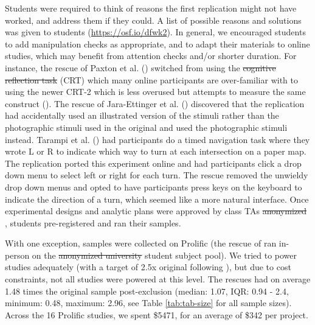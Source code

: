 \documentclass[
  english,
  a4paper,
]{article}
\providecommand{\DIFaddtex}[1]{{\protect\color{blue}\uwave{#1}}} %
\providecommand{\DIFdeltex}[1]{{\protect\color{red}\sout{#1}}}                      %
\providecommand{\DIFaddbegin}{} %
\providecommand{\DIFaddend}{} %
\providecommand{\DIFdelbegin}{} %
\providecommand{\DIFdelend}{} %
\providecommand{\DIFadd}[1]{\texorpdfstring{\DIFaddtex{#1}}{#1}} %
\providecommand{\DIFdel}[1]{\texorpdfstring{\DIFdeltex{#1}}{}} %
\newcommand{\DIFscaledelfig}{0.5}
\newlength{\DIFdelgraphicswidth} %
\newlength{\DIFdelgraphicsheight} %
\newcommand{\DIFaddincludegraphics}[2][]{{\color{blue}\fbox{\DIFOincludegraphics[#1]{#2}}}} %
\newcommand{\DIFdelincludegraphics}[2][]{%
\sbox{\DIFdelgraphicsbox}{\DIFOincludegraphics[#1]{#2}}%
\settoboxwidth{\DIFdelgraphicswidth}{\DIFdelgraphicsbox} %
\settoboxtotalheight{\DIFdelgraphicsheight}{\DIFdelgraphicsbox} %
\scalebox{\DIFscaledelfig}{%
\parbox[b]{\DIFdelgraphicswidth}{\usebox{\DIFdelgraphicsbox}\\[-\baselineskip] \rule{\DIFdelgraphicswidth}{0em}}\llap{\resizebox{\DIFdelgraphicswidth}{\DIFdelgraphicsheight}{%
\setlength{\unitlength}{\DIFdelgraphicswidth}%
\begin{picture}(1,1)%
\thicklines\linethickness{2pt} %
{\color[rgb]{1,0,0}\put(0,0){\framebox(1,1){}}}%
{\color[rgb]{1,0,0}\put(0,0){\line( 1,1){1}}}%
{\color[rgb]{1,0,0}\put(0,1){\line(1,-1){1}}}%
\end{picture}%
}\hspace*{3pt}}} %
} %
\DeclareRobustCommand{\DIFaddbegin}{\DIFOaddbegin \let\includegraphics\DIFaddincludegraphics} %
\DeclareRobustCommand{\DIFaddend}{\DIFOaddend \let\includegraphics\DIFOincludegraphics} %
\DeclareRobustCommand{\DIFdelbegin}{\DIFOdelbegin \let\includegraphics\DIFdelincludegraphics} %
\DeclareRobustCommand{\DIFdelend}{\DIFOaddend \let\includegraphics\DIFOincludegraphics} %
\begin{document}
Students were required to think of reasons the first replication might not have worked, and address them if they could.
A list of possible reasons and solutions was given to students (\url{https://osf.io/dfwk2}).
In general, we encouraged students to add manipulation checks as appropriate, and to adapt their materials to online studies, which may benefit from attention checks and/or shorter duration.
For instance, the rescue of Paxton et al. () switched from using the \DIFdelbegin \DIFdel{cognitive reflection task }\DIFdelend \DIFaddbegin \DIFadd{Cognitive Reflection Test }\DIFaddend (CRT) which many online participants are over-familiar with to using the newer CRT-2 which is less overused but attempts to measure the same construct ().
The rescue of Jara-Ettinger et al. () discovered that the replication had accidentally used an illustrated version of the stimuli rather than the photographic stimuli used in the original and used the photographic stimuli instead.
Tarampi et al. () had participants do a timed navigation task where they wrote L or R to indicate which way to turn at each intersection on a paper map.
The replication ported this experiment online and had participants click a drop down menu to select left or right for each turn.
The rescue removed the unwieldy drop down menus and opted to have participants press keys on the keyboard to indicate the direction of a turn, which seemed like a more natural interface.
Once experimental designs and analytic plans were approved by class TAs \DIFdelbegin %
\DIFdel{anonymized}%
\DIFdelend \DIFaddbegin \DIFadd{(VB and BP)}\DIFaddend , students pre-registered and ran their samples.

With one exception, samples were collected on Prolific (the rescue of  ran in-person on the \DIFdelbegin %
\DIFdel{anonymized university}%
\DIFdelend \DIFaddbegin \DIFadd{Stanford }\DIFaddend student subject pool).
We tried to power studies adequately (with a target of 2.5x original following ), but due to cost constraints, not all studies were powered at this level.
The rescues had on average 1.48 times the original sample post-exclusion (median: 1.07, IQR: 0.94 - 2.4, minimum: 0.48, maximum: 2.96, see Table \ref{tab:tab-size} for all sample sizes).
Across the 16 Prolific studies, we spent \$5471, for an average of \$342 per project.
\end{document}
